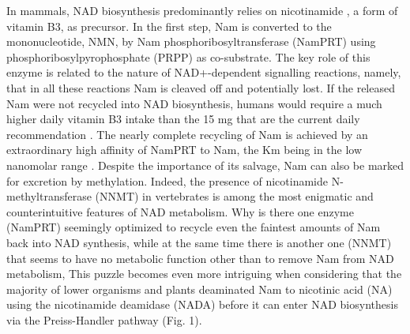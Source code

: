 In mammals, NAD biosynthesis predominantly relies on nicotinamide , a form of vitamin B3, as precursor. In the first step, Nam is converted to the mononucleotide, NMN, by Nam phosphoribosyltransferase (NamPRT) using phosphoribosylpyrophosphate (PRPP) as co-substrate. The key role of this enzyme is related to the nature of NAD+-dependent signalling reactions, namely, that in all these reactions Nam is cleaved off and potentially lost. If the released Nam were not recycled into NAD biosynthesis, humans would require a much higher daily vitamin B3 intake than the 15 mg that are the current daily recommendation . The nearly complete recycling of Nam is achieved by an extraordinary high affinity of NamPRT to Nam, the Km being in the low nanomolar range \cite{Burgos2008}. Despite the importance of its salvage, Nam can also be marked for excretion by methylation. Indeed, the presence of nicotinamide N-methyltransferase (NNMT) in vertebrates \cite{Gossmann2012} is among the most enigmatic and counterintuitive features of NAD metabolism. Why is there one enzyme (NamPRT) seemingly optimized to recycle even the faintest amounts of Nam back into NAD synthesis, while at the same time there is another one (NNMT) that seems to have no metabolic function other than to remove Nam from NAD metabolism, This puzzle becomes even more intriguing when considering that the majority of lower organisms and plants deaminated Nam to nicotinic acid (NA) using the nicotinamide deamidase (NADA) before it can enter NAD biosynthesis via the Preiss-Handler pathway (Fig. 1).

